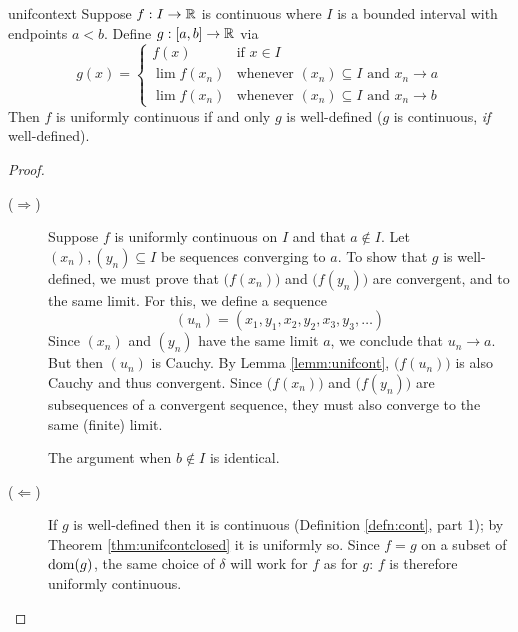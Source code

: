 \begin{thm}{}{unifcontext}
	Suppose $f:I\to\mathbb{R}$ is continuous where $I$ is a bounded interval with endpoints $a<b$. Define $g:[a,b]\to\mathbb{R}$ via
	\[
		g(x)=
		\begin{cases}
	  	f(x)&\text{if }x\in I\\
	  	\lim f(x_n)&\text{whenever }(x_n)\subseteq I\text{ and }x_n\to a\\
	  	\lim f(x_n)&\text{whenever }(x_n)\subseteq I\text{ and }x_n\to b
	  \end{cases}
	 \]
	 Then $f$ is uniformly continuous if and only $g$ is well-defined ($g$ is continuous, \emph{if} well-defined).
\end{thm}

\begin{proof}
	\begin{description}
	\item[\normalfont ($\Rightarrow$)] Suppose $f$ is uniformly continuous on $I$ and that $a\not\in I$. Let $(x_n),(y_n)\subseteq I$ be sequences converging to $a$. To show that $g$ is well-defined, we must prove that $\bigl(f(x_n)\bigr)$ and $\bigl(f(y_n)\bigr)$ are convergent, and to the same limit. For this, we define a sequence
	\[
		(u_n)=(x_1,y_1,x_2,y_2,x_3,y_3,\ldots)
	\]
	Since $(x_n)$ and $(y_n)$ have the same limit $a$, we conclude that $u_n\to a$. But then $(u_n)$ is Cauchy. By Lemma \ref{lemm:unifcont}, $\bigl(f(u_n)\bigr)$ is also Cauchy and thus convergent. Since $\bigl(f(x_n)\bigr)$ and $\bigl(f(y_n)\bigr)$ are subsequences of a convergent sequence, they must also converge to the same (finite) limit.\par
	The argument when $b\not\in I$ is identical.
	\item[\normalfont ($\Leftarrow$)] If $g$ is well-defined then it is continuous (Definition \ref{defn:cont}, part 1); by Theorem \ref{thm:unifcontclosed} it is uniformly so. Since $f=g$ on a subset of $\operatorname{dom}(g)$, the same choice of $\delta$ will work for $f$ as for $g$: $f$ is therefore uniformly continuous.\qedhere
	\end{description}
\end{proof}


